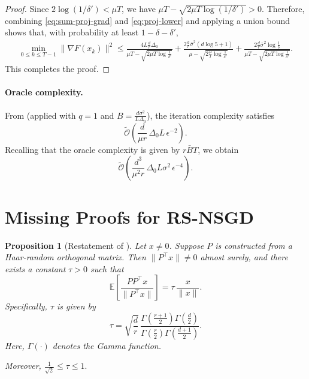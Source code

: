 \documentclass[10pt]{article}
\newtheorem{proposition}[proposition]{Proposition}
\begin{document}
\begin{proof}
Since $2\log(1/\delta')<\mu T$, we have
\(
\mu T-\sqrt{2\mu T\log(1/\delta')}>0.
\)
Therefore, 
combining \eqref{eq:sum-proj-grad} and \eqref{eq:proj-lower} and applying a union
bound shows that, with probability at least $1-\delta-\delta'$,
\begin{align*}
\min_{0\le k\le T-1}\|\nabla F(x_k)\|^2
\le
\frac{
4L\frac{d}{r}\Delta_0
}{
\mu T-\sqrt{2\mu T\log\frac{1}{\delta'}}
}
+
\frac{
2\frac{d}{r}\bar{\sigma}^2(d\log 5+1)
}{
\mu-\sqrt{2\frac{\mu}{T}\log\frac{1}{\delta'}}
}
+
\frac{
2\frac{d}{r}\bar{\sigma}^2\log\frac{1}{\delta}
}{
\mu T-\sqrt{2\mu T\log\frac{1}{\delta'}}
}.
\end{align*}
This completes the proof.
\end{proof}

\paragraph{Oracle complexity.}
From  (applied with $q=1$ and $B=\frac{d\sigma^2}{L\Delta_0}$),
the iteration complexity satisfies 
\[
\tilde{\mathcal O}\!\left(
\frac{d}{\mu r}\,\Delta_0 L\,\epsilon^{-2}
\right).
\]
Recalling that the oracle complexity is given by $r\bar{B}T$,
we obtain
\[
\tilde{\mathcal O}\!\left(
\frac{d^{3}}{\mu^{2}r}\,\Delta_0L\sigma^{2}\,\epsilon^{-4}
\right).
\]


\section{Missing Proofs for RS-NSGD}
\label{app:rnsgd}

\begin{proposition}[Restatement of ]\label{app:prop:tau}
Let \(x \neq 0\). Suppose \(P\) is constructed from a Haar-random orthogonal matrix.
Then \(\|P^\top x\| \neq 0\) almost surely, and there exists a constant
\(\tau > 0\) such that
\[
\mathbb{E}\!\left[\frac{PP^\top x}{\|P^\top x\|}\right]
=
\tau\,\frac{x}{\|x\|}.
\]
Specifically, \(\tau\) is given by
\[
\tau
=
\sqrt{\frac{d}{r}}\,
\frac{
\Gamma\!\left(\frac{r+1}{2} \right)
\Gamma\!\left(\frac{d}{2}\right)
}{
\Gamma\!\left(\frac{r}{2}\right)
\Gamma\!\left(\frac{d+1}{2} \right)
}.
\]
Here, $\Gamma(\cdot)$ denotes the Gamma function.

Moreover,  $\frac{1}{\sqrt{2}} \leq \tau \leq 1.$
\end{proposition}
\end{document}

